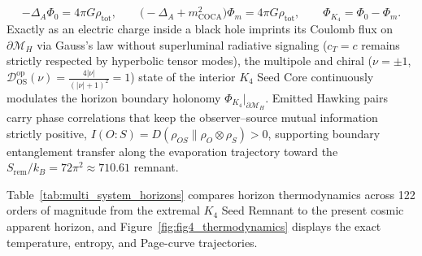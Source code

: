\documentclass[11pt,a4paper]{article}
\theoremstyle{remark}
\begin{document}
\begin{itemize}
\begin{equation}
    -\Delta_A \Phi_0 = 4\pi G\rho_{\mathrm{tot}}, \qquad \bigl(-\Delta_A + m_{\mathrm{COCA}}^2\bigr)\Phi_m = 4\pi G\rho_{\mathrm{tot}}, \qquad \Phi_{K_4} = \Phi_0 - \Phi_m.
    \label{eq:elliptic_gauss}
  \end{equation}
  Exactly as an electric charge inside a black hole imprints its Coulomb flux on $\partial\mathcal{M}_H$ via Gauss's law without superluminal radiative signaling ($c_T = c$ remains strictly respected by hyperbolic tensor modes), the multipole and chiral ($\nu = \pm 1$, $\mathcal{D}_{\mathrm{OS}}^{\mathrm{op}}(\nu) = \frac{4|\nu|}{(|\nu|+1)^2} = 1$) state of the interior $K_4$ Seed Core continuously modulates the horizon boundary holonomy $\Phi_{K_4}|_{\partial\mathcal{M}_H}$. Emitted Hawking pairs carry phase correlations that keep the observer--source mutual information strictly positive, $I(O:S) = D(\rho_{OS} \parallel \rho_O \otimes \rho_S) > 0$, supporting boundary entanglement transfer along the evaporation trajectory toward the $S_{\mathrm{rem}}/k_B = 72\pi^2 \approx 710.61$ remnant.
\end{itemize}

Table~\ref{tab:multi_system_horizons} compares horizon thermodynamics across 122 orders of magnitude from the extremal $K_4$ Seed Remnant to the present cosmic apparent horizon, and Figure~\ref{fig:fig4_thermodynamics} displays the exact temperature, entropy, and Page-curve trajectories.
\end{document}
